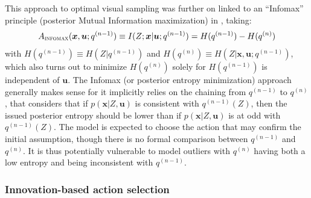 \documentclass[12pt,twoside,openright]{article}
\begin{document}
This approach to optimal visual sampling was further on linked to an ``Infomax'' principle {\color{Purple} (posterior Mutual Information maximization)} in \citet{butko2010infomax}, 
taking:
\begin{align}A_\text{\sc infomax}(\boldsymbol{x}, \boldsymbol{u}; q^{(n-1)}) \equiv I(Z; \boldsymbol{x}|\boldsymbol{u}; q^{(n-1)})
= H(q^{(n-1)}) - H(q^{(n)})
\label{eq:infomax}
\end{align}
with  $H(q^{(n-1)}) \equiv H(Z|q^{(n-1)})$ and $H(q^{(n)}) \equiv H(Z|\boldsymbol{x}, \boldsymbol{u}; q^{(n-1)})$, {\color{Purple} which also turns out to minimize $H(q^{(n)})$ solely for $H(q^{(n-1)})$ is independent of $\boldsymbol{u}$}.
The Infomax (or posterior entropy minimization) approach generally makes sense for it implicitly relies on the chaining from $q^{(n-1)}$ to $q^{(n)}$, that considers that if $p(\boldsymbol{x}|Z, \boldsymbol{u})$ is consistent with $q^{(n-1)}(Z)$, then the issued posterior entropy should be lower than if $p(\boldsymbol{x}|Z, \boldsymbol{u})$ is at odd with $q^{(n-1)}(Z)$. The model is expected to choose the action that may confirm the initial assumption, though there is no formal comparison between $q^{(n-1)}$ and $q^{(n)}$.
It is thus potentially vulnerable to model outliers with $q^{(n)}$ having both a low entropy and being inconsistent with $q^{(n-1)}$.

\subsubsection{Innovation-based action selection}\label{sec:saliency}
\end{document}
